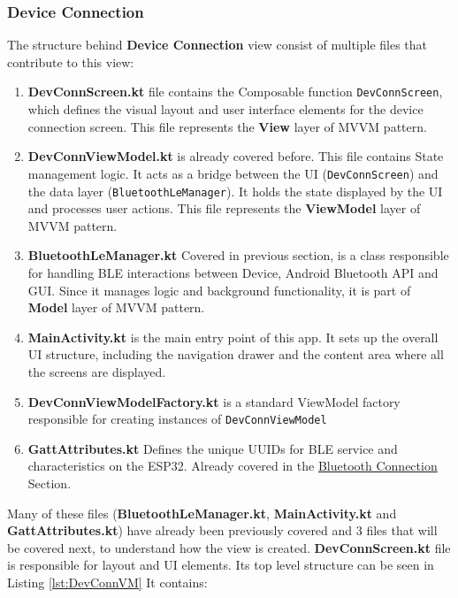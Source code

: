 \subsubsection{Device Connection}
The structure behind \textbf{Device Connection} view consist of multiple files that contribute to this view:
\begin{enumerate}
	\item \textbf{DevConnScreen.kt} file contains the Composable function \texttt{DevConnScreen}, which defines the visual layout and user interface elements for the device connection screen. This file represents the \textbf{View} layer of \ac{MVVM} pattern.
	\item \textbf{DevConnViewModel.kt} is already covered before. This file contains State management logic. It acts as a bridge between the UI (\texttt{DevConnScreen}) and the data layer (\texttt{BluetoothLeManager}). It holds the state displayed by the UI and processes user actions. This file represents the \textbf{ViewModel} layer of \ac{MVVM} pattern.
	\item \textbf{BluetoothLeManager.kt} Covered in previous section, is a class responsible for handling \ac{BLE} interactions between Device, Android Bluetooth \ac{API} and \ac{GUI}. Since it manages logic and background functionality, it is part of \textbf{Model} layer of \ac{MVVM} pattern.
	\item \textbf{MainActivity.kt} is the main entry point of this app. It sets up the overall UI structure, including the navigation drawer and the content area where all the screens are displayed.
	\item \textbf{DevConnViewModelFactory.kt} is a standard ViewModel factory responsible for creating instances of \texttt{DevConnViewModel}
	\item \textbf{GattAttributes.kt} Defines the unique UUIDs for \ac{BLE} service and characteristics on the ESP32. Already covered in the \hyperref[subsec:Bluetooth]{Bluetooth Connection} Section.
\end{enumerate}
Many of these files (\textbf{BluetoothLeManager.kt}, \textbf{MainActivity.kt} and \textbf{GattAttributes.kt}) have already been previously covered and 3 files that will be covered next, to understand how the view is created.
\textbf{DevConnScreen.kt} file is responsible for layout and \ac{UI} elements. Its top level structure can be seen in Listing \ref{lst:DevConnVM} It contains:
